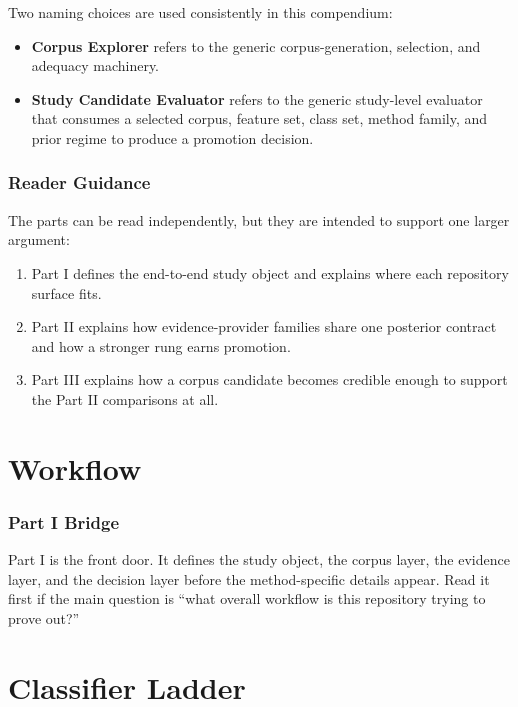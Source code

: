\documentclass[11pt]{article}
\begin{document}
Two naming choices are used consistently in this compendium:
\begin{itemize}[leftmargin=1.5em]
  \item \textbf{Corpus Explorer} refers to the generic corpus-generation, selection, and adequacy machinery.
  \item \textbf{Study Candidate Evaluator} refers to the generic study-level evaluator that consumes a selected corpus, feature set, class set, method family, and prior regime to produce a promotion decision.
\end{itemize}

\section{Reader Guidance}
The parts can be read independently, but they are intended to support one larger argument:
\begin{enumerate}[leftmargin=1.5em]
  \item Part I defines the end-to-end study object and explains where each repository surface fits.
  \item Part II explains how evidence-provider families share one posterior contract and how a stronger rung earns promotion.
  \item Part III explains how a corpus candidate becomes credible enough to support the Part II comparisons at all.
\end{enumerate}

\part{Workflow}
\section*{Part I Bridge}
Part I is the front door. It defines the study object, the corpus layer, the evidence layer, and the decision layer before the method-specific details appear. Read it first if the main question is ``what overall workflow is this repository trying to prove out?''

\begingroup
\let\maketitle\relax
{}

\endgroup

\part{Classifier Ladder}
\end{document}
